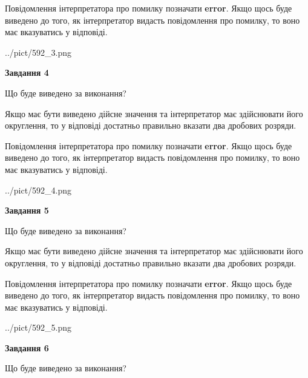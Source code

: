 \documentclass[12pt, ukrainian]{article}
\begin{document}
{\begin {Large}
Повідомлення інтерпретатора про помилку позначати \textbf{error}.
Якщо щось буде виведено до того, як інтерпретатор видасть повідомлення про помилку, 
то воно має вказуватись у відповіді. \par

\begin{center}
	{../pict/592_3.png}
\end{center}
\newpage

{\begin {center}\textbf{Завдання 4}\end {center}}\par
Що буде виведено за виконання? \par

Якщо має бути виведено дійсне значення та інтерпретатор має здійснювати його округлення, 
то у відповіді достатньо правильно вказати два дробових розряди.

Повідомлення інтерпретатора про помилку позначати \textbf{error}.
Якщо щось буде виведено до того, як інтерпретатор видасть повідомлення про помилку, 
то воно має вказуватись у відповіді. \par

\begin{center}
	{../pict/592_4.png}
\end{center}
\newpage

{\begin {center}\textbf{Завдання 5}\end {center}}\par
Що буде виведено за виконання? \par

Якщо має бути виведено дійсне значення та інтерпретатор має здійснювати його округлення, 
то у відповіді достатньо правильно вказати два дробових розряди.

Повідомлення інтерпретатора про помилку позначати \textbf{error}.
Якщо щось буде виведено до того, як інтерпретатор видасть повідомлення про помилку, 
то воно має вказуватись у відповіді. \par

\begin{center}
	{../pict/592_5.png}
\end{center}
\newpage

{\begin {center}\textbf{Завдання 6}\end {center}}\par
Що буде виведено за виконання? \par


\end{Large}}
\end{document}
